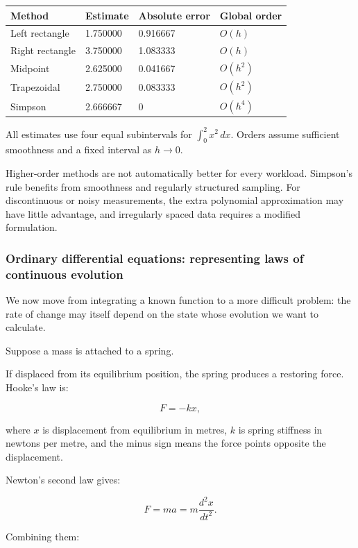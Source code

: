 {\def\LTcaptype{none} %
\begin{longtable}[]{@{}llll@{}}
\toprule\noalign{}
Method & Estimate & Absolute error & Global order \\
\midrule\noalign{}
\endhead
\bottomrule\noalign{}
\endlastfoot
Left rectangle & 1.750000 & 0.916667 & \(O(h)\) \\
Right rectangle & 3.750000 & 1.083333 & \(O(h)\) \\
Midpoint & 2.625000 & 0.041667 & \(O(h^2)\) \\
Trapezoidal & 2.750000 & 0.083333 & \(O(h^2)\) \\
Simpson & 2.666667 & 0 & \(O(h^4)\) \\
\end{longtable}
}

All estimates use four equal subintervals for \(\int_0^2x^2\,dx\). Orders assume sufficient smoothness and a fixed interval as \(h\to0\).

Higher-order methods are not automatically better for every workload. Simpson's rule benefits from smoothness and regularly structured sampling. For discontinuous or noisy measurements, the extra polynomial approximation may have little advantage, and irregularly spaced data requires a modified formulation.

\subsubsection{Ordinary differential equations: representing laws of continuous evolution}\label{02-foundations-ii-ch022-ordinary-differential-equations-representing-laws-of-continuous-evolution}

We now move from integrating a known function to a more difficult problem: the rate of change may itself depend on the state whose evolution we want to calculate.

Suppose a mass is attached to a spring.

If displaced from its equilibrium position, the spring produces a restoring force. Hooke's law is:

\[
F=-kx,
\]

where \(x\) is displacement from equilibrium in metres, \(k\) is spring stiffness in newtons per metre, and the minus sign means the force points opposite the displacement.

Newton's second law gives:

\[
F=ma=m\frac{d^2x}{dt^2}.
\]

Combining them:

